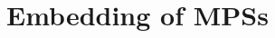 \documentclass[12pt,dvipdfmx,twoside,openright]{report}
\begin{document}
\section{Embedding of MPSs}





 
\end{document}
